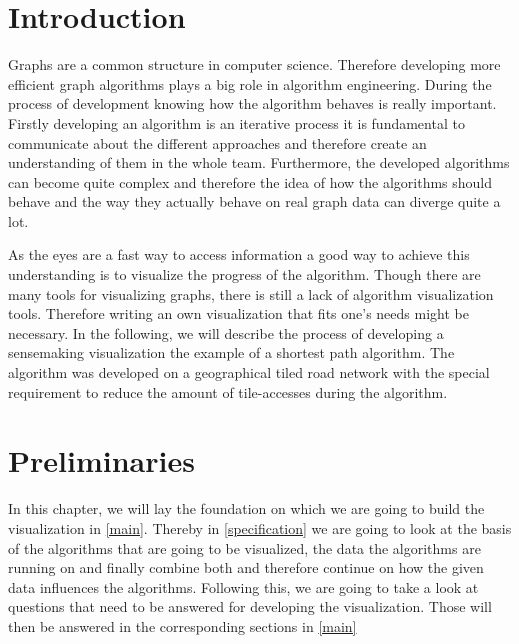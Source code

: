 \documentclass
[
	paper = a4,
    pagesize,
	12 pt,
	oneside,                       %
    open = right,
	DIV = calc,
	BCOR = 0 mm,                   %
	bibtotoc
]
{scrbook}
\begin{document}
\frontmatter







\mainmatter
\chapter{Introduction} \label{introduction}
Graphs are a common structure in computer science.
Therefore developing more efficient graph algorithms plays a big role in algorithm engineering.
During the process of development knowing how the algorithm behaves is really important.
Firstly developing an algorithm is an iterative process it is fundamental to communicate about the different approaches and therefore create an understanding of them in the whole team.
Furthermore, the developed algorithms can become quite complex and therefore the idea of how the algorithms should behave and the way they actually behave on real graph data can diverge quite a lot.
\par
As the eyes are a fast way to access information a good way to achieve this understanding is to visualize the progress of the algorithm.
Though there are many tools for visualizing graphs, there is still a lack of algorithm visualization tools.
Therefore writing an own visualization that fits one's needs might be necessary.
In the following, we will describe the process of developing a sensemaking visualization the example of a shortest path algorithm. The algorithm was developed on a geographical tiled road network with the special requirement to reduce the amount of tile-accesses during the algorithm.


\chapter{Preliminaries} \label{questions}

In this chapter, we will lay the foundation on which we are going to build the visualization in \cref{main}.
\newline Thereby in \cref{specification} we are going to look at the basis of the algorithms that are going to be visualized, the data the algorithms are running on and finally combine both and therefore continue on how the given data influences the algorithms.
Following this, we are going to take a look at questions that need to be answered for developing the visualization.
Those will then be answered in the corresponding sections in \cref{main}
\end{document}
